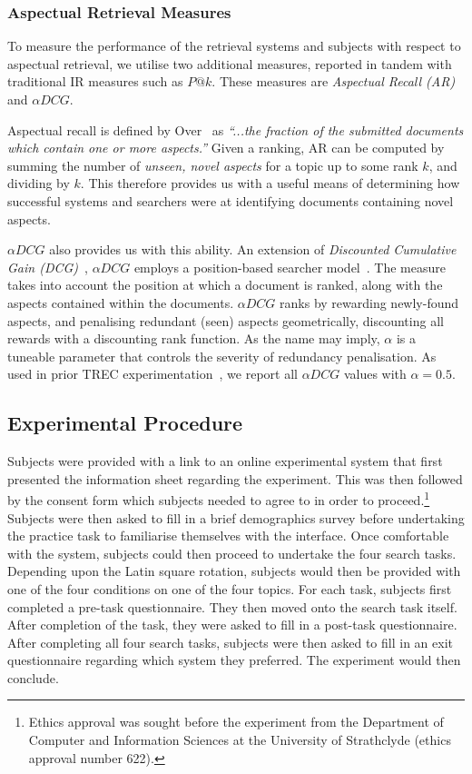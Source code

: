 \subsubsection{Aspectual Retrieval Measures}\label{sec_measures}
To measure the performance of the retrieval systems and subjects with respect to aspectual retrieval, we utilise two additional measures, reported in tandem with traditional IR measures such as $P@k$. These measures are \emph{Aspectual Recall (AR)} and $\alpha DCG$.

Aspectual recall is defined by Over~\cite{over1998trec} as \emph{``...the fraction of the submitted documents which contain one or more aspects.''} Given a ranking, AR can be computed by summing the number of \emph{unseen, novel aspects} for a topic up to some rank $k$, and dividing by $k$. This therefore provides us with a useful means of determining how successful systems and searchers were at identifying documents containing novel aspects.

$\alpha DCG$ also provides us with this ability. An extension of \emph{Discounted Cumulative Gain (DCG)}~\cite{jarvelin2002ndcg}, $\alpha DCG$ employs a position-based searcher model~\cite{clarke2008novelty_diversity}. The measure takes into account the position at which a document is ranked, along with the aspects contained within the documents. $\alpha DCG$ ranks by rewarding newly-found aspects, and penalising redundant (seen) aspects geometrically, discounting all rewards with a discounting rank function. As the name may imply, $\alpha$ is a tuneable parameter that controls the severity of redundancy penalisation. As used in prior TREC experimentation~\cite{over2001trec}, we report all $\alpha DCG$ values with $\alpha=0.5$.


\subsection{Experimental Procedure}
Subjects were provided with a link to an online experimental system that first presented the information sheet regarding the experiment. This was then followed by the consent form which subjects needed to agree to in order to proceed.\footnote{Ethics approval was sought before the experiment from the Department of Computer and Information Sciences at the University of Strathclyde (ethics approval number 622).} Subjects were then asked to fill in a brief demographics survey before undertaking the practice task to familiarise themselves with the interface. Once comfortable with the system, subjects could then proceed to undertake the four search tasks. Depending upon the Latin square rotation, subjects would then be provided with one of the four conditions on one of the four topics. For each task, subjects first completed a pre-task questionnaire. They then moved onto the search task itself. After completion of the task, they were asked to fill in a post-task questionnaire. After completing all four search tasks, subjects were then asked to fill in an exit questionnaire regarding which system they preferred. The experiment would then conclude.

